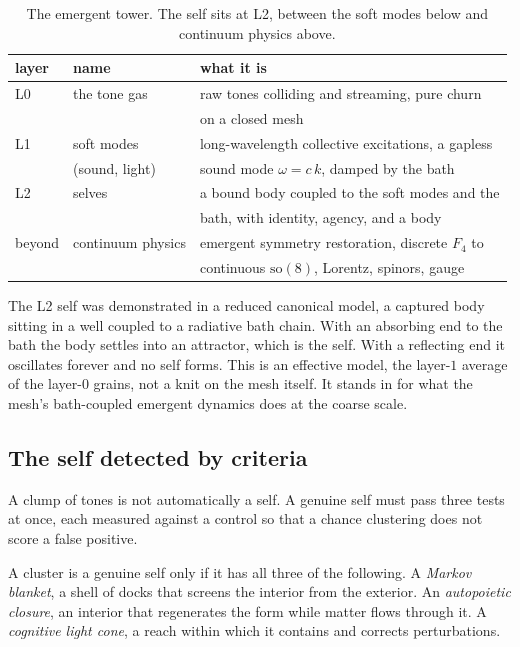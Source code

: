 \begin{table}[ht]
\centering
\begin{tabular}{@{}lll@{}}
\toprule
layer & name & what it is \\
\midrule
L0 & the tone gas & raw tones colliding and streaming, pure churn \\
 & & on a closed mesh \\
L1 & soft modes & long-wavelength collective excitations, a gapless \\
 & (sound, light) & sound mode $\omega = c\, k$, damped by the bath \\
L2 & selves & a bound body coupled to the soft modes and the \\
 & & bath, with identity, agency, and a body \\
beyond & continuum physics & emergent symmetry restoration, discrete $F_4$ to \\
 & & continuous $\mathrm{so}(8)$, Lorentz, spinors, gauge \\
\bottomrule
\end{tabular}
\caption{The emergent tower. The self sits at L2, between the soft modes below and continuum physics above.}
\label{tab:emergent-tower}
\end{table}

The L2 self was demonstrated in a reduced canonical model, a captured body sitting in a well coupled to a radiative bath chain. With an absorbing end to the bath the body settles into an attractor, which is the self. With a reflecting end it oscillates forever and no self forms. This is an effective model, the layer-$1$ average of the layer-$0$ grains, not a knit on the mesh itself. It stands in for what the mesh's bath-coupled emergent dynamics does at the coarse scale.

\subsection{The self detected by criteria}

A clump of tones is not automatically a self. A genuine self must pass three tests at once, each measured against a control so that a chance clustering does not score a false positive.

\begin{definition}
A cluster is a genuine self only if it has all three of the following.
A \emph{Markov blanket}, a shell of docks that screens the interior from the exterior.
An \emph{autopoietic closure}, an interior that regenerates the form while matter flows through it.
A \emph{cognitive light cone}, a reach within which it contains and corrects perturbations.
\end{definition}

